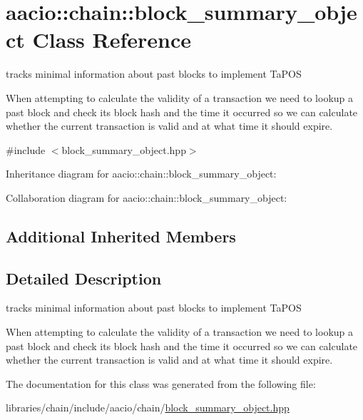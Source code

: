 \hypertarget{classaacio_1_1chain_1_1block__summary__object}{}\section{aacio\+:\+:chain\+:\+:block\+\_\+summary\+\_\+object Class Reference}
\label{classaacio_1_1chain_1_1block__summary__object}


tracks minimal information about past blocks to implement Ta\+P\+OS

When attempting to calculate the validity of a transaction we need to lookup a past block and check its block hash and the time it occurred so we can calculate whether the current transaction is valid and at what time it should expire.  




{\ttfamily \#include $<$block\+\_\+summary\+\_\+object.\+hpp$>$}



Inheritance diagram for aacio\+:\+:chain\+:\+:block\+\_\+summary\+\_\+object\+:


Collaboration diagram for aacio\+:\+:chain\+:\+:block\+\_\+summary\+\_\+object\+:
\subsection*{Additional Inherited Members}


\subsection{Detailed Description}
tracks minimal information about past blocks to implement Ta\+P\+OS

When attempting to calculate the validity of a transaction we need to lookup a past block and check its block hash and the time it occurred so we can calculate whether the current transaction is valid and at what time it should expire. 

The documentation for this class was generated from the following file\+:\begin{DoxyCompactItemize}
\item 
libraries/chain/include/aacio/chain/\mbox{\hyperlink{block__summary__object_8hpp}{block\+\_\+summary\+\_\+object.\+hpp}}\end{DoxyCompactItemize}
